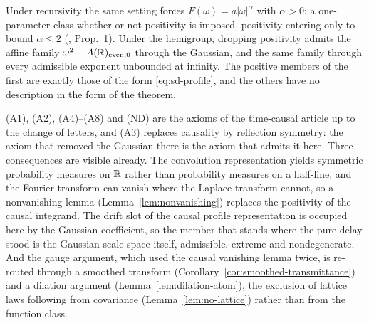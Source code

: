 Under recursivity the same setting forces $F(\omega) = a|\omega|^\alpha$ with $\alpha > 0$: a
one-parameter class whether or not positivity is imposed, positivity entering only to bound
$\alpha \le 2$ (, Prop.~1). Under the hemigroup, dropping
positivity admits the affine family $\omega^2 + A(\mathbb{R})_{\mathrm{even},0}$ through the
Gaussian, and the same family through every admissible exponent unbounded at infinity. The
positive members of the first are exactly those of the form \ref{eq:sd-profile}, and the
others have no description in the form of the theorem.

\begin{remark}\label{rem:provenance-causal}
(A1), (A2), (A4)--(A8) and (ND) are the axioms of the time-causal article
 up to the change of letters, and (A3) replaces causality
by reflection symmetry: the axiom that removed the Gaussian there is the axiom that admits
it here. Three consequences are visible already. The convolution representation yields
symmetric probability measures on $\mathbb{R}$ rather than probability measures on a half-line,
and the Fourier transform can vanish where the Laplace transform cannot, so a nonvanishing
lemma (Lemma~\ref{lem:nonvanishing}) replaces the positivity of the causal integrand. The
drift slot of the causal profile representation is occupied here by the Gaussian
coefficient, so the member that stands where the pure delay stood is the Gaussian scale
space itself, admissible, extreme and nondegenerate. And the gauge argument, which used the
causal vanishing lemma twice, is re-routed through a smoothed transform
(Corollary~\ref{cor:smoothed-transmittance}) and a dilation argument
(Lemma~\ref{lem:dilation-atom}), the exclusion of lattice laws following from covariance
(Lemma~\ref{lem:no-lattice}) rather than from the function class.
\end{remark}
